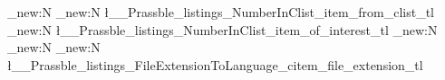 \ExplSyntaxOn
    \int_new:N \numberinclist
      \tl_new:N \l__Prassble_listings_NumberInClist_item_from_clist_tl
      \tl_new:N \l__Prassble_listings_NumberInClist_item_of_interest_tl
      \tl_new:N \displayedname
      \tl_new:N \pygmentsname
      \tl_new:N \l__Prassble_listings_FileExtensionToLanguage_citem_file_extension_tl
